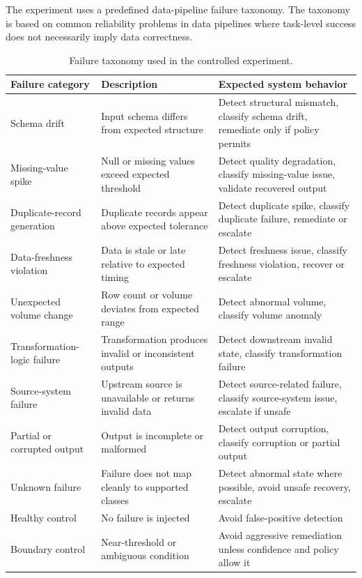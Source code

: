 The experiment uses a predefined data-pipeline failure taxonomy. The taxonomy is based on common reliability problems in data pipelines where task-level success does not necessarily imply data correctness.

\begin{table}[t]
\caption{Failure taxonomy used in the controlled experiment.}
\label{tab:methodology-2}
\centering
\scriptsize
\begin{tabularx}{\linewidth}{@{}>{\raggedright\arraybackslash}X>{\raggedright\arraybackslash}X>{\raggedright\arraybackslash}X@{}}
\toprule
\textbf{Failure category} & \textbf{Description} & \textbf{Expected system behavior} \\
\midrule
Schema drift & Input schema differs from expected structure & Detect structural mismatch, classify schema drift, remediate only if policy permits \\
Missing-value spike & Null or missing values exceed expected threshold & Detect quality degradation, classify missing-value issue, validate recovered output \\
Duplicate-record generation & Duplicate records appear above expected tolerance & Detect duplicate spike, classify duplicate failure, remediate or escalate \\
Data-freshness violation & Data is stale or late relative to expected timing & Detect freshness issue, classify freshness violation, recover or escalate \\
Unexpected volume change & Row count or volume deviates from expected range & Detect abnormal volume, classify volume anomaly \\
Transformation-logic failure & Transformation produces invalid or inconsistent outputs & Detect downstream invalid state, classify transformation failure \\
Source-system failure & Upstream source is unavailable or returns invalid data & Detect source-related failure, classify source-system issue, escalate if unsafe \\
Partial or corrupted output & Output is incomplete or malformed & Detect output corruption, classify corruption or partial output \\
Unknown failure & Failure does not map cleanly to supported classes & Detect abnormal state where possible, avoid unsafe recovery, escalate \\
Healthy control & No failure is injected & Avoid false-positive detection \\
Boundary control & Near-threshold or ambiguous condition & Avoid aggressive remediation unless confidence and policy allow it \\
\bottomrule
\end{tabularx}
\end{table}


